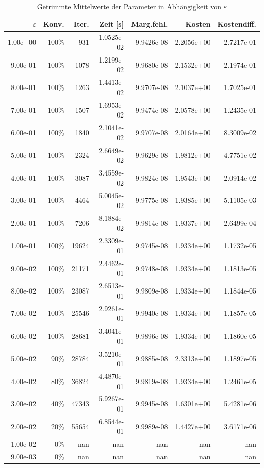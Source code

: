 \begin{table}[htbp]
\caption{Getrimmte Mittelwerte der Parameter in Abhängigkeit von $\varepsilon$}
\label{tab:Parametertest64_tol1e-07}
\small
\centering
{}
\begin{tabular}{rrrrrrr}
\toprule
$\varepsilon$ & Konv. & Iter. & Zeit [s] & Marg.fehl. & Kosten & Kostendiff. \\
\midrule
1.00e+00 & 100\% & 931 & 1.0525e-02 & 9.9426e-08 & 2.2056e+00 & 2.7217e-01 \\
9.00e-01 & 100\% & 1078 & 1.2199e-02 & 9.9680e-08 & 2.1532e+00 & 2.1974e-01 \\
8.00e-01 & 100\% & 1263 & 1.4413e-02 & 9.9707e-08 & 2.1037e+00 & 1.7025e-01 \\
7.00e-01 & 100\% & 1507 & 1.6953e-02 & 9.9474e-08 & 2.0578e+00 & 1.2435e-01 \\
6.00e-01 & 100\% & 1840 & 2.1041e-02 & 9.9707e-08 & 2.0164e+00 & 8.3009e-02 \\
5.00e-01 & 100\% & 2324 & 2.6649e-02 & 9.9629e-08 & 1.9812e+00 & 4.7751e-02 \\
4.00e-01 & 100\% & 3087 & 3.4559e-02 & 9.9824e-08 & 1.9543e+00 & 2.0914e-02 \\
3.00e-01 & 100\% & 4464 & 5.0045e-02 & 9.9775e-08 & 1.9385e+00 & 5.1105e-03 \\
2.00e-01 & 100\% & 7206 & 8.1884e-02 & 9.9814e-08 & 1.9337e+00 & 2.6499e-04 \\
1.00e-01 & 100\% & 19624 & 2.3309e-01 & 9.9745e-08 & 1.9334e+00 & 1.1732e-05 \\
9.00e-02 & 100\% & 21171 & 2.4462e-01 & 9.9748e-08 & 1.9334e+00 & 1.1813e-05 \\
8.00e-02 & 100\% & 23087 & 2.6513e-01 & 9.9809e-08 & 1.9334e+00 & 1.1844e-05 \\
7.00e-02 & 100\% & 25546 & 2.9261e-01 & 9.9940e-08 & 1.9334e+00 & 1.1857e-05 \\
6.00e-02 & 100\% & 28681 & 3.4041e-01 & 9.9896e-08 & 1.9334e+00 & 1.1860e-05 \\
5.00e-02 & 90\% & 28784 & 3.5210e-01 & 9.9885e-08 & 2.3313e+00 & 1.1897e-05 \\
4.00e-02 & 80\% & 36824 & 4.4870e-01 & 9.9819e-08 & 1.9334e+00 & 1.2461e-05 \\
3.00e-02 & 40\% & 47343 & 5.9267e-01 & 9.9945e-08 & 1.6301e+00 & 5.4281e-06 \\
2.00e-02 & 20\% & 55654 & 6.8544e-01 & 9.9989e-08 & 1.4427e+00 & 3.6171e-06 \\
1.00e-02 & 0\% & nan & nan & nan & nan & nan \\
9.00e-03 & 0\% & nan & nan & nan & nan & nan \\
\bottomrule
\end{tabular}
\end{table}
